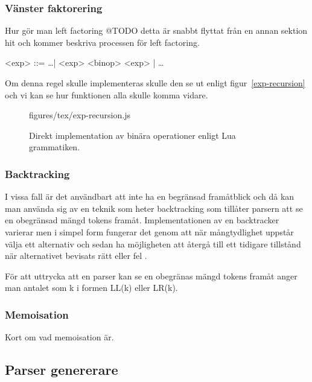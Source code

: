 \subsubsection{Vänster faktorering}

Hur gör man left factoring @TODO detta är snabbt flyttat från en annan sektion
hit och kommer beskriva processen för left factoring.

\setlength{\grammarindent}{5em}
\begin{grammar}
  \singlespace\small%
  \selectfont
  <exp> ::= \ldots | <exp> <binop> <exp> | \ldots
\end{grammar}

Om denna regel skulle implementeras skulle den se ut enligt
figur~\ref{exp-recursion} och vi kan se hur funktionen alla skulle komma
vidare.

\begin{figure}[ht]
    {figures/tex/exp-recursion.js}
  \caption{Direkt implementation av binära operationer enligt Lua grammatiken.}
  \label{fig:exp-recursion}
\end{figure}

\subsubsection{Backtracking}

I vissa fall är det användbart att inte ha en begränsad framåtblick och då kan
man använda sig av en teknik som heter backtracking som tillåter parsern att
se en obegränsad mängd tokens framåt. Implementationen av en backtracker
varierar men i simpel form fungerar det genom att när mångtydlighet uppstår
välja ett alternativ och sedan ha möjligheten att återgå till ett tidigare
tillstånd när alternativet bevisats rätt eller fel \citep[s. 55]{pt10}.

För att uttrycka att en parser kan se en obegränas mängd tokens framåt anger
man antalet som k i formen LL(k) eller LR(k).

\subsubsection{Memoisation}

Kort om vad memoisation är.

\subsection{Parser genererare}

